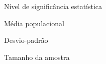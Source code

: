 


\item[$ \alpha $] Nível de significância estatística
\item[$ \mu $] Média populacional
\item[$ \sigma $] Desvio-padrão
\item[$ n $] Tamanho da amostra
